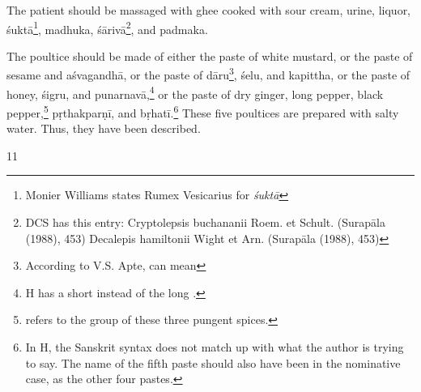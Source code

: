 \begin{translation}
    The patient should be massaged with ghee cooked with sour cream, urine, liquor, \gls{śuktā}\footnote{Monier Williams states Rumex Vesicarius for \textit{śuktā}}, \gls{madhuka}, \gls{śārivā}\footnote{DCS has this entry: Cryptolepsis buchananii Roem. et Schult. (Surapāla (1988), 453) Decalepis hamiltonii Wight et Arn. (Surapāla (1988), 453)}, and \gls{padmaka}.
    
     The poultice should be made of either the paste of white mustard, or the paste of sesame and \gls{aśvagandhā}, or the paste of \gls{dāru}\footnote{According to V.S. Apte,  can mean }, \gls{śelu}, and \gls{kapittha}, or the paste of honey, \gls{śigru}, and \gls{punarnavā},\footnote{H has a short  instead of the long .} or the paste of dry ginger, long pepper, black pepper,\footnote{ refers to the group of these three pungent spices.} \gls{pṛthakparṇī}, and \gls{bṛhatī}.\footnote{In H, the Sanskrit syntax does not match up with what the author is trying to say. The name of the fifth paste should also have been in the nominative case, as the other four pastes.} These five poultices are prepared with salty water. Thus, they have been described.

     \item[11] 
    
\end{translation}
